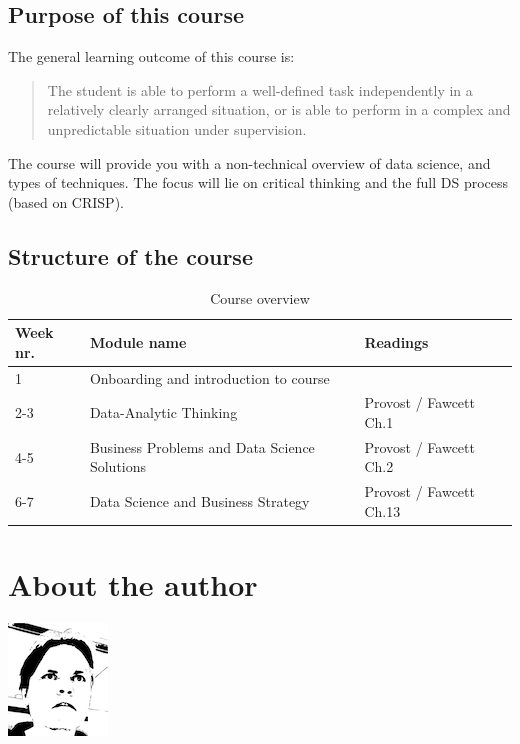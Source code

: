 \documentclass[
]{book}
\begin{document}
\hypertarget{purpose-of-this-course}{%
\section*{Purpose of this course}\label{purpose-of-this-course}}

The general learning outcome of this course is:

\begin{quote}
The student is able to perform a well-defined task independently in a relatively clearly arranged situation, or is able to perform in a complex and unpredictable situation under supervision.
\end{quote}

The course will provide you with a non-technical overview of data science, and types of techniques. The focus will lie on critical thinking and the full DS process (based on CRISP).

\hypertarget{structure-of-the-course}{%
\section*{Structure of the course}\label{structure-of-the-course}}

\begin{longtable}[t]{lll}
\caption{\label{tab:unnamed-chunk-1}Course overview}\\
\toprule
Week nr. & Module name & Readings\\
\midrule
1 & Onboarding and introduction to course & \\
2-3 & Data-Analytic Thinking & Provost / Fawcett Ch.1\\
4-5 & Business Problems and Data Science Solutions & Provost / Fawcett Ch.2\\
6-7 & Data Science and Business Strategy & Provost / Fawcett Ch.13\\
\bottomrule
\end{longtable}

\hypertarget{about-the-author}{%
\chapter*{About the author}\label{about-the-author}}

\includegraphics{images/me.png}
\end{document}
